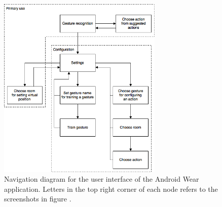 \begin{figure}[!htb]
    \centering
    \includegraphics[width=0.7\textwidth]{images/wear-navigation-diagram}
    \caption{Navigation diagram for the user interface of the Android Wear application. Letters in the top right corner of each node refers to the screenshots in figure .}
    \label{fig:implementation:prototype:navigation-diagram}
\end{figure}

